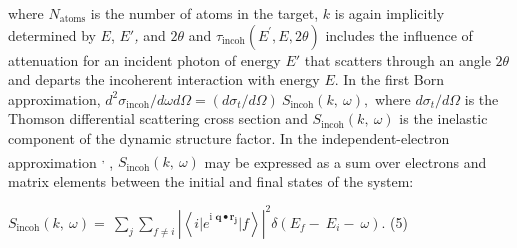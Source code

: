 where \(N_{\text{atoms}}\) is the number of atoms in the target, \(k\)
is again implicitly determined by \(E\), \(E'\)\emph{,} and \(2\theta\)
and \(\tau_{\text{incoh}}\left( E^{'},E,2\theta \right)\) includes the
influence of attenuation for an incident photon of energy \(E'\) that
scatters through an angle \(2\theta\) and departs the incoherent
interaction with energy \(E\). In the first Born approximation,
\(d^{2}\sigma_{\text{incoh}}/d\omega d\Omega = (d\sigma_{t}/d\Omega)\ S_{\text{incoh}}\left( k,\ \omega \right),\)
where \(d\sigma_{t}/d\Omega\) is the Thomson differential scattering
cross section and \(S_{\text{incoh}}\left( k,\ \omega \right)\) is the
inelastic component of the dynamic structure factor. In the
independent-electron approximation
\hyperref[j.-chihara-journal-of-physics-condensed-matter-12-231-2000.]\cite{CHIHARA2000INTERACTION}\textsuperscript{,}
\hyperref[w.-schuelke-electron-dynamics-by-inelastic-x-ray-scattering-oxford-university-press-new-york-2007.]\cite{SCHULKE2007ELECTRON},
\(S_{\text{incoh}}\left( k,\ \omega \right)\) may be expressed as a sum
over electrons and matrix elements between the initial and final states
of the system:

\(S_{\text{incoh}}\left( k,\ \omega \right) = \ \sum_{j}^{}{\sum_{f \neq i}^{}{\left| \left\langle {i|e}^{\text{i\ }\mathbf{q \bullet}\mathbf{r}_{\mathbf{j}}}|f \right\rangle \right|^{2}\delta(E_{f} - \ E_{i} - \ \omega)}}\).
(5)

